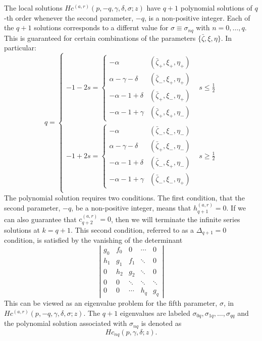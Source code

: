 \documentclass[11pt]{article}
\begin{document}
The local solutions $Hc^{(a,r)}(p,-q,\gamma,\delta,\sigma;z)$ have $q+1$
polynomial solutions of $q$-th order whenever the second parameter,
$-q$, is a non-positive integer.  Each of the $q+1$ solutions
corresponds to a differnt value for $\sigma\equiv\sigma_{nq}$ with
$n=0,\ldots,q$.  This is guaranteed for certain combinations of the
parameters $\{\bar\zeta,\xi,\eta\}$.  In particular:
\begin{equation}
  q= \left\{\begin{array}{lc}
  -1-2s = \left\{\begin{array}{cc}
            -\alpha & (\bar\zeta_+,\xi_+,\eta_+) \\
            \alpha-\gamma-\delta & (\bar\zeta_\minus,\xi_+,\eta_+) \\
            -\alpha-1+\delta & (\bar\zeta_+,\xi_\minus,\eta_+) \\
            -\alpha-1+\gamma & (\bar\zeta_+,\xi_+,\eta_\minus)
  \end{array}\right. & s\le\frac12 \\
  -1+2s = \left\{\begin{array}{cc}
            -\alpha & (\bar\zeta_\minus,\xi_\minus,\eta_\minus) \\
            \alpha-\gamma-\delta & (\bar\zeta_+,\xi_\minus,\eta_\minus) \\
            -\alpha-1+\delta & (\bar\zeta_\minus,\xi_+,\eta_\minus) \\
            -\alpha-1+\gamma & (\bar\zeta_\minus,\xi_\minus,\eta_+)
  \end{array}\right. & s\ge\frac12 \\
\end{array}\right.
\end{equation}
The polynomial solution requires two conditions.  The first condition,
that the second parameter, $-q$, be a non-positive integer, means that
$h^{(a,r)}_{q+1}=0$.  If we can also guarantee that
$c^{(a,r)}_{q+2}=0$, then we will terminate the infinite series
solutions at $k=q+1$.  This second condition, referred to as a
$\Delta_{q+1}=0$ condition, is satisfied by the vanishing of the
determinant
\begin{equation}
  \left|\begin{array}{ccccc}
  g_0 & f_0 & 0 & \cdots & 0 \\
  h_1 & g_1 & f_1 & \ddots & 0 \\
  0 & h_2 & g_2 & \ddots & 0 \\
  0 & 0 & \ddots & \ddots & \ddots \\
  0 & 0 & \cdots & h_q & g_q
  \end{array}\right|
\end{equation}
This can be viewed as an eigenvalue problem for the fifth parameter,
$\sigma$, in $Hc^{(a,r)}(p,-q,\gamma,\delta,\sigma;z)$.  The $q+1$
eigenvalues are labeled $\sigma_{0q},\sigma_{1q},\ldots,\sigma_{qq}$
and the polynomial solution associated with $\sigma_{nq}$ is denoted
as
\begin{equation}
  Hc_{nq}(p,\gamma,\delta;z).
\end{equation}
\end{document}
